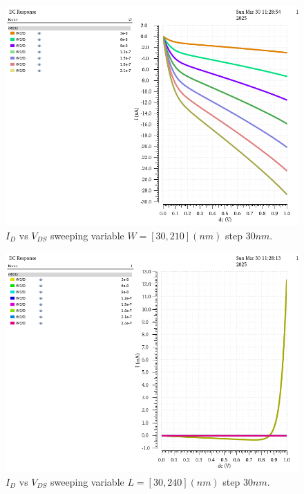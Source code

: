 
\begin{figure}[H]
	\centering
	\includegraphics[width = .6\linewidth]{sections/pic/EX2_PMOS_Id&Vds(Vgs(w_30_210)(l).png}
	\caption{$I_D$ vs $V_{DS}$ sweeping variable $W = [30, 210](nm)$ step $30nm$.}
	\label{f_EX2_PMOS_Id&Vds(Vgs(w_30_210)(l)}
\end{figure}


\begin{figure}[H]
	\centering
	\includegraphics[width = .6\linewidth]{sections/pic/EX2_PMOS_Id&Vds(Vgs(w)(l_30_240).png}
	\caption{$I_D$ vs $V_{DS}$ sweeping variable $L = [30, 240](nm)$ step $30nm$.}
	\label{f_EX2_PMOS_Id&Vds(Vgs(w)(l_30_240)}
\end{figure}